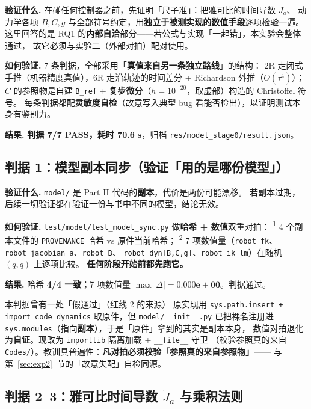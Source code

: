 \documentclass[11pt,a4paper]{ctexart}
\newcommand{\stage}[1]{\textsuperscript{#1}}
\begin{document}
\textbf{验证什么.} 在碰任何控制器之前，先证明「尺子准」：把雅可比的时间导数 $\dot J_a$、
动力学各项 $B,C,g$ 与全部符号约定，用\textbf{独立于被测实现的数值手段}逐项检验一遍。
这里回答的是 RQ1 的\textbf{内部自洽}部分——若公式与实现「一起错」，本实验会整体通过，
故它必须与实验二（外部对拍）配对使用。

\textbf{如何验证.} 7 条判据，全部采用「\textbf{真值来自另一条独立路线}」的结构：
2R 走闭式手推（机器精度真值），6R 走沿轨迹的时间差分 + Richardson 外推（$O(\tau^4)$）；
$C$ 的参照物是自建 \texttt{B\_ref} + \textbf{复步微分}（$h=10^{-20}$，取虚部）构造的 Christoffel 符号。
每条判据都配\textbf{灵敏度自检}（故意写入典型 bug 看能否检出），以证明测试本身有鉴别力。

\textbf{结果.} \textbf{判据 7/7 PASS，耗时 70.6 s}，归档 \texttt{res/model\_stage0/result.json}。

\subsection{判据 1：模型副本同步（验证「用的是哪份模型」）}\label{sec:c1sync}

\textbf{验证什么.} \texttt{model/} 是 Part II 代码的\textbf{副本}，代价是两份可能漂移。
若副本过期，后续一切验证都在验证一份与书中不同的模型，结论无效。

\textbf{如何验证.} \texttt{test/model/test\_model\_sync.py} 做\textbf{哈希 + 数值}双重对拍：
\stage{1} 4 个副本文件的 \texttt{PROVENANCE} 哈希 vs 原件当前哈希；
\stage{2} 7 项数值量（\texttt{robot\_fk}、\texttt{robot\_jacobian\_a}、\texttt{robot\_B}、
\texttt{robot\_dyn[B,C,g]}、\texttt{robot\_ik\_lm}）在随机 $(q,\dot q)$ 上逐项比较。
\textbf{任何阶段开始前都先跑它。}

\textbf{结果.} 哈希 \textbf{4/4 一致}；7 项数值量 $\max|\Delta|=\mathbf{0.000e+00}$。判据通过。

\begin{warnbox}{本判据曾有一处「假通过」（红线 2 的来源）}
原实现用 \texttt{sys.path.insert + import code\_dynamics} 取原件，但 \texttt{model/\_\_init\_\_.py}
已把裸名注册进 \texttt{sys.modules}（指向\textbf{副本}），于是「原件」拿到的其实是副本本身，
数值对拍退化为\textbf{自证}。现改为 \texttt{importlib} 隔离加载 + \texttt{\_\_file\_\_} 守卫
（校验参照真的来自 \texttt{Codes/}）。教训具普遍性：\textbf{凡对拍必须校验「参照真的来自参照物」}——
与第~\ref{sec:exp2}~节的「故意失配」自检同源。
\end{warnbox}

\subsection{判据 2--3：雅可比时间导数 $\dot J_a$ 与乘积法则}
\end{document}
